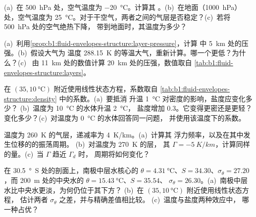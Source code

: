 \begin{exercise}[$\star\star$]\label{exo:b1:fluid-envelopes-structure:5}
(a)~在 \qty{500}{hPa} 处，空气温度为 \qty{-20}{\celsius}。计算其
。(b)~在地面（\qty{1000}{hPa}）处，空气温度为
\qty{25}{\celsius}。对于干空气，两者之间的气层是否稳定？(c)~若将
\qty{500}{hPa} 处的空气绝热下降，
带到地面时，其温度为多少？
\end{exercise}

\begin{exercise}[$\star\star$]\label{exo:b1:fluid-envelopes-structure:6}
(a)~利用\cref{prop:b1:fluid-envelopes-structure:layer-pressure}，计算
中 \qty{5}{km} 处的压强。(b)~假设大气为
温度 \qty{288.15}{K} 的等温大气，重新计算。哪一个更低？为什么？(c)~
由 \qty{11}{km} 处的数值计算 \qty{20}{km} 处的压强，数值取自
\cref{tab:b1:fluid-envelopes-structure:layers}。
\end{exercise}

\begin{exercise}[$\star\star$]\label{exo:b1:fluid-envelopes-structure:7}
在 $(35, \qty{10}{\celsius})$ 附近使用线性状态方程，系数取自
\cref{tab:b1:fluid-envelopes-structure:density} 中的系数。(a)~要抵消
升温 \qty{1}{\celsius} 对密度的影响，盐度应变化多少？
(b)~温度为 \qty{10}{\celsius} 的水体升温 \qty{2}{\celsius}，
盐度增加 \num{0.3}。它变得更密还是更轻？变化多少？(c)~对温度为
\qty{0}{\celsius} 的水体回答同一问题，
并使用该温度下的系数。
\end{exercise}

\begin{exercise}[$\star\star$]\label{exo:b1:fluid-envelopes-structure:8}
温度为 \qty{260}{K} 的气层，递减率为 \qty{4}{K/km}。(a)~计算其
浮力频率，以及在其中发生位移的的振荡周期。
(b)~对温度为 \qty{270}{K} 的层，
其 $\Gamma = \qty{-5}{K/km}$，计算同样的量。(c)~当 $\Gamma$ 趋近 $\Gamma_d$ 时，
周期将如何变化？
\end{exercise}

\begin{exercise}[$\star\star$]\label{exo:b1:fluid-envelopes-structure:9}
在 \qty{30.5}{\degree S} 处的剖面上，南极中层水核心的 $\theta =
\qty{4.31}{\celsius}$、$S = 34.30$、$\sigma_\theta = 27.20$，而
\qty{200}{m} 处的中央水的 $\theta = \qty{15.43}{\celsius}$、$S = 35.54$、
$\sigma_\theta = 26.30$。(a)~南极中层水比中央水更淡，为何仍位于其下方？
(b)~在 $(35, \qty{10}{\celsius})$ 附近使用线性状态方程，
估计两者 $\sigma_\theta$ 之差，并与精确差值相比较。
(c)~温度与盐度两种效应中，
哪一种占优？
\end{exercise}

